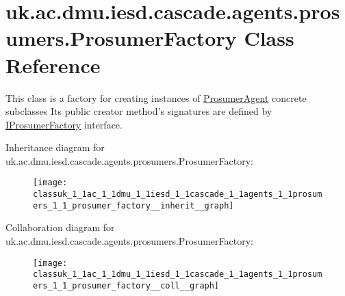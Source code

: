 \hypertarget{classuk_1_1ac_1_1dmu_1_1iesd_1_1cascade_1_1agents_1_1prosumers_1_1_prosumer_factory}{\section{uk.\-ac.\-dmu.\-iesd.\-cascade.\-agents.\-prosumers.\-Prosumer\-Factory Class Reference}
\label{classuk_1_1ac_1_1dmu_1_1iesd_1_1cascade_1_1agents_1_1prosumers_1_1_prosumer_factory}
}


This class is a factory for creating instances of {\ttfamily \hyperlink{classuk_1_1ac_1_1dmu_1_1iesd_1_1cascade_1_1agents_1_1prosumers_1_1_prosumer_agent}{Prosumer\-Agent}} concrete subclasses Its public creator method's signatures are defined by \hyperlink{interfaceuk_1_1ac_1_1dmu_1_1iesd_1_1cascade_1_1agents_1_1prosumers_1_1_i_prosumer_factory}{I\-Prosumer\-Factory} interface.  




Inheritance diagram for uk.\-ac.\-dmu.\-iesd.\-cascade.\-agents.\-prosumers.\-Prosumer\-Factory\-:\nopagebreak
\begin{figure}[H]
\begin{center}
\leavevmode
\texttt{[image: classuk\_1\_1ac\_1\_1dmu\_1\_1iesd\_1\_1cascade\_1\_1agents\_1\_1prosumers\_1\_1\_prosumer\_factory\_\_inherit\_\_graph]}
\end{center}
\end{figure}


Collaboration diagram for uk.\-ac.\-dmu.\-iesd.\-cascade.\-agents.\-prosumers.\-Prosumer\-Factory\-:\nopagebreak
\begin{figure}[H]
\begin{center}
\leavevmode
\texttt{[image: classuk\_1\_1ac\_1\_1dmu\_1\_1iesd\_1\_1cascade\_1\_1agents\_1\_1prosumers\_1\_1\_prosumer\_factory\_\_coll\_\_graph]}
\end{center}
\end{figure}
